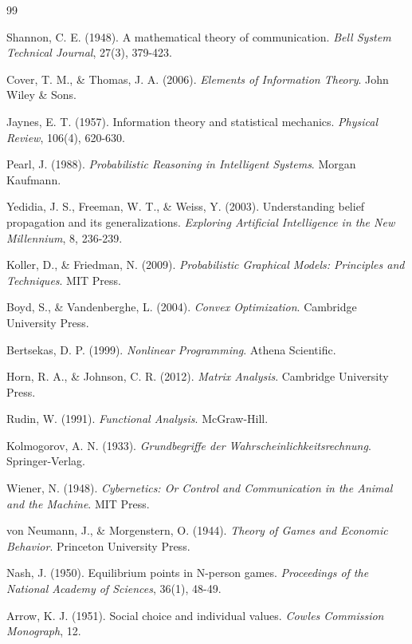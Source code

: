 \documentclass[12pt,a4paper]{article}
\begin{document}

\begin{thebibliography}{99}

Shannon, C. E. (1948). A mathematical theory of communication. \textit{Bell System Technical Journal}, 27(3), 379-423.

Cover, T. M., \& Thomas, J. A. (2006). \textit{Elements of Information Theory}. John Wiley \& Sons.

Jaynes, E. T. (1957). Information theory and statistical mechanics. \textit{Physical Review}, 106(4), 620-630.

Pearl, J. (1988). \textit{Probabilistic Reasoning in Intelligent Systems}. Morgan Kaufmann.

Yedidia, J. S., Freeman, W. T., \& Weiss, Y. (2003). Understanding belief propagation and its generalizations. \textit{Exploring Artificial Intelligence in the New Millennium}, 8, 236-239.

Koller, D., \& Friedman, N. (2009). \textit{Probabilistic Graphical Models: Principles and Techniques}. MIT Press.

Boyd, S., \& Vandenberghe, L. (2004). \textit{Convex Optimization}. Cambridge University Press.

Bertsekas, D. P. (1999). \textit{Nonlinear Programming}. Athena Scientific.

Horn, R. A., \& Johnson, C. R. (2012). \textit{Matrix Analysis}. Cambridge University Press.

Rudin, W. (1991). \textit{Functional Analysis}. McGraw-Hill.

Kolmogorov, A. N. (1933). \textit{Grundbegriffe der Wahrscheinlichkeitsrechnung}. Springer-Verlag.

Wiener, N. (1948). \textit{Cybernetics: Or Control and Communication in the Animal and the Machine}. MIT Press.

von Neumann, J., \& Morgenstern, O. (1944). \textit{Theory of Games and Economic Behavior}. Princeton University Press.

Nash, J. (1950). Equilibrium points in N-person games. \textit{Proceedings of the National Academy of Sciences}, 36(1), 48-49.

Arrow, K. J. (1951). Social choice and individual values. \textit{Cowles Commission Monograph}, 12.

\end{thebibliography}
\end{document}
